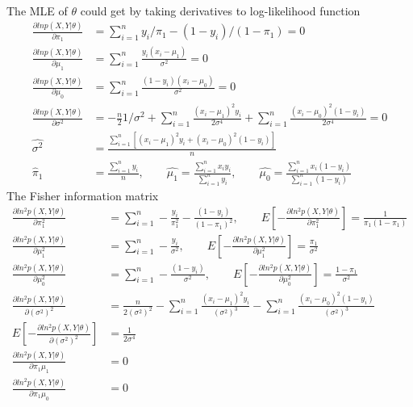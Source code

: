\documentclass[11pt]{article} %
\begin{document}
\begin{itemize}
\begin{align*}
	\end{align*} 
	The MLE of $\theta$ could get by taking derivatives to log-likelihood function
	\begin{align*}
		\frac{\partial ln p(X, Y|\theta)}{\partial \pi_1}  &= \sum_{i=1}^n y_i/\pi_1 - (1-y_i)/(1-\pi_1)=0\\
		\frac{\partial ln p(X, Y|\theta)}{\partial \mu_1}  &= \sum_{i=1}^n \frac{y_i(x_i-\mu_1)}{\sigma^2}=0     \\
		\frac{\partial ln p(X, Y|\theta)}{\partial \mu_0}  &= \sum_{i=1}^n \frac{(1-y_i)(x_i-\mu_0)}{\sigma^2}=0\\
		\frac{\partial ln p(X, Y|\theta)}{\partial \sigma^2}  &= -\frac{n}{2}{1/\sigma^2} + \sum_{i=1}^n \frac{(x_i-\mu_1)^2y_i}{2\sigma^4} + \sum_{i=1}^n \frac{(x_i-\mu_0)^2(1-y_i)}{2\sigma^4} = 0\\
		\hat{\sigma^2} &= \frac{\sum_{i=1}^n [(x_i-\mu_1)^2y_i + (x_i-\mu_0)^2(1-y_i)]}{n}\\
		\hat\pi_1 &= \frac{\sum_{i=1}^n y_i}{n}, \qquad \hat{\mu_1} =  \frac{\sum_{i=1}^n x_iy_i}{\sum_{i=1}^n y_i}, \qquad \hat{\mu_0} =  \frac{\sum_{i=1}^n x_i(1-y_i)}{\sum_{i=1}^n (1-y_i)}
	\end{align*} 
	The Fisher information matrix 
	\begin{align*}
		\frac{\partial ln^2 p(X, Y|\theta)}{\partial \pi_1^2}  &= \sum_{i=1}^n -\frac{y_i}{\pi_1^2} - \frac{(1-y_i)}{(1-\pi_1)^2} , \qquad E[-\frac{\partial ln^2 p(X, Y|\theta)}{\partial \pi_1^2}] =  \frac{1}{\pi_1(1-\pi_1)}\\
		\frac{\partial ln^2 p(X, Y|\theta)}{\partial \mu_1^2}  &= \sum_{i=1}^n -\frac{y_i}{\sigma^2}, \qquad E[-\frac{\partial ln^2 p(X, Y|\theta)}{\partial \mu_1^2} ]= \frac{\pi_1}{\sigma^2}\\
		\frac{\partial ln^2 p(X, Y|\theta)}{\partial \mu_0^2}  &= \sum_{i=1}^n -\frac{(1-y_i)}{\sigma^2}, \qquad E[- \frac{\partial ln^2 p(X, Y|\theta)}{\partial \mu_0^2}] = \frac{1-\pi_1}{\sigma^2}\\
		\frac{\partial ln^2 p(X, Y|\theta)}{\partial (\sigma^2)^2}  &= \frac{n}{2 (\sigma^2)^2} - \sum_{i=1}^n \frac{(x_i-\mu_1)^2y_i}{(\sigma^2)^3} - \sum_{i=1}^n \frac{(x_i-\mu_0)^2(1-y_i)}{(\sigma^2)^3}\\
		E[-\frac{\partial ln^2 p(X, Y|\theta)}{\partial (\sigma^2)^2}] &= \frac{1}{2\sigma^4} \\
		\frac{\partial ln^2 p(X, Y|\theta)}{\partial \pi_1\mu_1}  &=0\\
		\frac{\partial ln^2 p(X, Y|\theta)}{\partial \pi_1\mu_0}  &=0\\

\end{align*}
\end{itemize}
\end{document}
